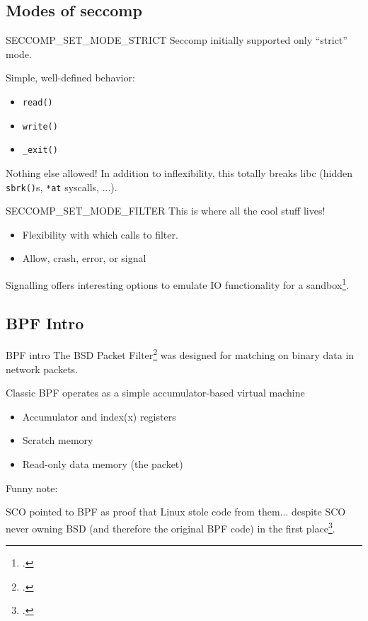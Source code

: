 \documentclass[handout]{beamer}
\begin{document}
\subsection{Modes of seccomp}
\begin{frame}{SECCOMP\_SET\_MODE\_STRICT}
Seccomp initially supported only ``strict'' mode.

Simple, well-defined behavior:
\begin{itemize}
 \item \texttt{read()}
 \item \texttt{write()}
 \item \texttt{\_exit()}
\end{itemize}
\pause

Nothing else allowed!
\pause
In addition to inflexibility, this totally breaks libc (hidden \texttt{sbrk()}s, \texttt{*at} syscalls, ...).
\end{frame}

\begin{frame}{SECCOMP\_SET\_MODE\_FILTER}
This is where all the cool stuff lives!


\begin{itemize}
 \item Flexibility with which calls to filter.
 \item Allow, crash, error, or signal
\end{itemize}
\pause
Signalling offers interesting options to emulate IO functionality for a sandbox\footcite{chromium}.
\end{frame}

\subsection{BPF Intro}
\begin{frame}{BPF intro}
 The BSD Packet Filter\footcite{bpfpaper} was designed for matching on binary data in network packets.
 \pause
 
 Classic BPF operates as a simple accumulator-based virtual machine
 \begin{itemize}
  \item Accumulator and index(x) registers
  \item Scratch memory
  \item Read-only data memory (the packet)
 \end{itemize}
\end{frame}

\begin{frame}
 Funny note: 
 
 SCO pointed to BPF as proof that Linux stole code from them...
 \pause despite SCO never owning BSD (and therefore the original BPF code) in the first place\footcite{scobullshit}.
\end{frame}
\end{document}
